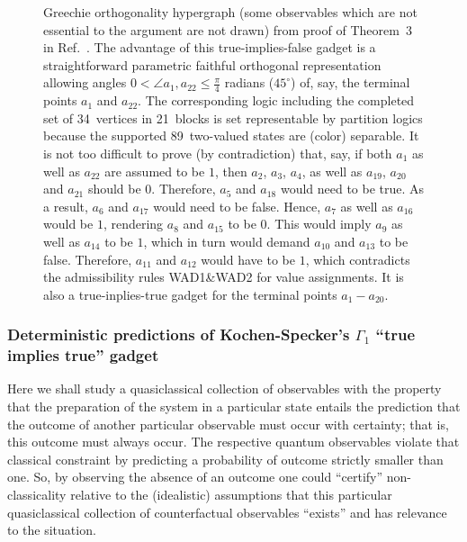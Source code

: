 \begin{figure}
\begin{center}
\begin{tikzpicture}  [scale=0.5, rotate= 0]
\end{tikzpicture}
\end{center}
\caption{\label{2019-c-HH10}
Greechie orthogonality hypergraph (some observables which are not essential to the argument are not drawn)
from proof of
Theorem~3 in Ref.~\cite{Ramanathan-18}.
The advantage of this true-implies-false gadget
is a straightforward parametric faithful orthogonal representation allowing angles
$0< \angle a_1,a_{22} \le \frac{\pi}{4}$ radians ($45^\circ$)
of, say, the terminal points $a_1$ and $a_{22}$.
The corresponding logic including the completed set of
34~vertices in
21~blocks is set representable by partition logics because the supported 89~two-valued
states are (color) separable.
It is not too difficult to prove (by contradiction) that, say,
if both $a_1$ as well as $a_{22}$
are assumed to be $1$, then
$a_2$,
$a_3$,
$a_4$,
as well as
$a_{19}$,
$a_{20}$
and $a_{21}$
should be $0$.
Therefore,
$a_5$ and
$a_{18}$
would need to be true.
As a result,
$a_{6}$ and
$a_{17}$ would need to be false.
Hence,
$a_{7}$ as well as
$a_{16}$ would be $1$,
rendering
$a_{8}$ and
$a_{15}$ to be $0$.
This would imply
$a_{9}$ as well as
$a_{14}$ to be $1$,
which in turn would demand
$a_{10}$ and
$a_{13}$ to be false.
Therefore,
$a_{11}$ and
$a_{12}$ would have to be $1$, which contradicts the admissibility rules  WAD1{\&}WAD2
for value assignments.
It is also a true-inplies-true gadget for the terminal points
$a_1-a_{20}$.
}
\end{figure}


\subsubsection{Deterministic predictions of Kochen-Specker's $\Gamma_1$ ``true implies true'' gadget}
\label{2017-b-s-tit}


Here we shall study a quasiclassical collection of observables with the property that the preparation of the system in a particular state
entails the prediction that the outcome of another particular observable must occur with certainty; that is, this outcome must always occur.
The respective quantum observables violate that classical constraint by predicting a  probability of outcome strictly smaller than one.
So, by observing the absence of an outcome one could ``certify'' non-classicality relative to the (idealistic) assumptions
that this particular  quasiclassical collection of counterfactual observables ``exists'' and has relevance to the situation.

